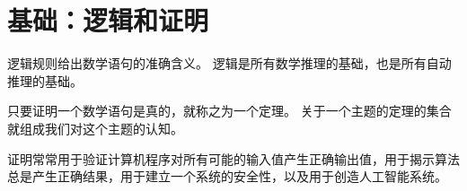 \chapter{基础：逻辑和证明}
{
    逻辑规则给出数学语句的准确含义。
    逻辑是所有数学推理的基础，也是所有自动推理的基础。

    只要证明一个数学语句是真的，就称之为一个定理。
    关于一个主题的定理的集合就组成我们对这个主题的认知。

    证明常常用于验证计算机程序对所有可能的输入值产生正确输出值，用于揭示算法总是产生正确结果，用于建立一个系统的安全性，以及用于创造人工智能系统。

    
    
    
}

\cleardoublepage

\endinput
